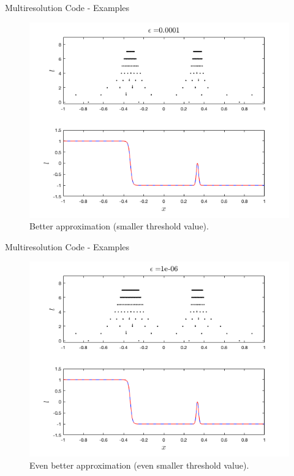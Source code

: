 \documentclass{beamer}
\begin{document}
\begin{frame}[shrink=15]{Multiresolution Code - Examples}
	\begin{figure}
		\center
		\includegraphics[scale=0.5]{plots/spike-med.png}
		\caption{Better approximation (smaller threshold value).}
	\end{figure}	
\end{frame}


\begin{frame}[shrink=15]{Multiresolution Code - Examples}
	\begin{figure}
		\center
		\includegraphics[scale=0.5]{plots/spike-hi.png}
		\caption{Even better approximation (even smaller threshold value).}
	\end{figure}	
\end{frame}
\end{document}
